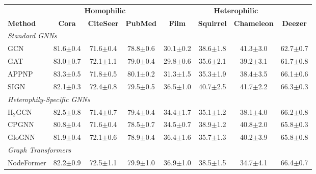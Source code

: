 \documentclass[sigconf]{acmart}
\begin{document}
\begin{table}[t]
\centering
\small
\setlength{\tabcolsep}{4pt}
\begin{tabular}{l|ccc|cccc}
\toprule
 & \multicolumn{3}{c|}{\textbf{Homophilic}} & \multicolumn{4}{c}{\textbf{Heterophilic}} \\
\textbf{Method} & \textbf{Cora} & \textbf{CiteSeer} & \textbf{PubMed} & \textbf{Film} & \textbf{Squirrel} & \textbf{Chameleon} & \textbf{Deezer} \\
\midrule
\multicolumn{8}{l}{\textit{Standard GNNs}} \\
GCN & 81.6{\scriptsize$\pm$0.4} & 71.6{\scriptsize$\pm$0.4} & 78.8{\scriptsize$\pm$0.6} & 30.1{\scriptsize$\pm$0.2} & 38.6{\scriptsize$\pm$1.8} & 41.3{\scriptsize$\pm$3.0} & 62.7{\scriptsize$\pm$0.7} \\
GAT & 83.0{\scriptsize$\pm$0.7} & 72.1{\scriptsize$\pm$1.1} & 79.0{\scriptsize$\pm$0.4} & 29.8{\scriptsize$\pm$0.6} & 35.6{\scriptsize$\pm$2.1} & 39.2{\scriptsize$\pm$3.1} & 61.7{\scriptsize$\pm$0.8} \\
APPNP & 83.3{\scriptsize$\pm$0.5} & 71.8{\scriptsize$\pm$0.5} & 80.1{\scriptsize$\pm$0.2} & 31.3{\scriptsize$\pm$1.5} & 35.3{\scriptsize$\pm$1.9} & 38.4{\scriptsize$\pm$3.5} & 66.1{\scriptsize$\pm$0.6} \\
SIGN & 82.1{\scriptsize$\pm$0.3} & 72.4{\scriptsize$\pm$0.8} & 79.5{\scriptsize$\pm$0.5} & 36.5{\scriptsize$\pm$1.0} & 40.7{\scriptsize$\pm$2.5} & 41.7{\scriptsize$\pm$2.2} & 66.3{\scriptsize$\pm$0.3} \\
\midrule
\multicolumn{8}{l}{\textit{Heterophily-Specific GNNs}} \\
H$_2$GCN & 82.5{\scriptsize$\pm$0.8} & 71.4{\scriptsize$\pm$0.7} & 79.4{\scriptsize$\pm$0.4} & 34.4{\scriptsize$\pm$1.7} & 35.1{\scriptsize$\pm$1.2} & 38.1{\scriptsize$\pm$4.0} & 66.2{\scriptsize$\pm$0.8} \\
CPGNN & 80.8{\scriptsize$\pm$0.4} & 71.6{\scriptsize$\pm$0.4} & 78.5{\scriptsize$\pm$0.7} & 34.5{\scriptsize$\pm$0.7} & 38.9{\scriptsize$\pm$1.2} & 40.8{\scriptsize$\pm$2.0} & 65.8{\scriptsize$\pm$0.3} \\
GloGNN & 81.9{\scriptsize$\pm$0.4} & 72.1{\scriptsize$\pm$0.6} & 78.9{\scriptsize$\pm$0.4} & 36.4{\scriptsize$\pm$1.6} & 35.7{\scriptsize$\pm$1.3} & 40.2{\scriptsize$\pm$3.9} & 65.8{\scriptsize$\pm$0.8} \\
\midrule
\multicolumn{8}{l}{\textit{Graph Transformers}} \\
NodeFormer & 82.2{\scriptsize$\pm$0.9} & 72.5{\scriptsize$\pm$1.1} & 79.9{\scriptsize$\pm$1.0} & 36.9{\scriptsize$\pm$1.0} & 38.5{\scriptsize$\pm$1.5} & 34.7{\scriptsize$\pm$4.1} & 66.4{\scriptsize$\pm$0.7} \\

\end{tabular}
\end{table}
\end{document}
